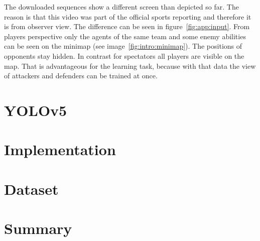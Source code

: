 The downloaded sequences show a different screen than depicted so far. The reason is that 
this video was part of the official sports reporting and therefore it is from observer view. The 
difference can be seen in figure~\ref{fig:app:input}. From players perspective only the agents of the 
same team and some enemy abilities can be seen on the minimap (see 
image~\ref{fig:intro:minimap}). The positions of opponents stay hidden. In contrast for spectators all 
players are visible on the map. That is advantageous for the learning task, because with that data the 
view of attackers and defenders can be trained at once. 

\section{YOLOv5}\label{sec:app:yolov5}

\section{Implementation}\label{sec:app:impl}

\section{Dataset}\label{sec:app:dataset}

\section{Summary}\label{sec:app:summary}
